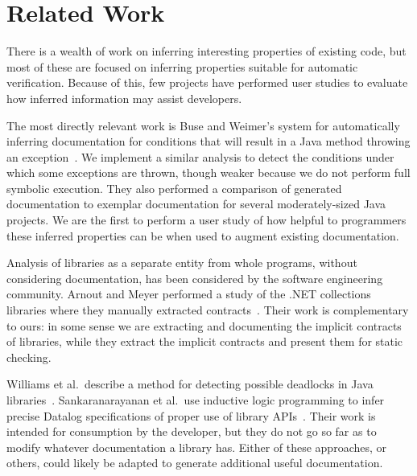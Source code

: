 \section{Related Work}
There is a wealth of work on inferring interesting properties of existing code,
but most of these are focused on inferring properties suitable for automatic
verification.
Because of this, few projects have performed user studies to evaluate how
inferred information may assist developers.

The most directly relevant work is Buse and Weimer's system for automatically
inferring documentation for conditions that will result in a Java method
throwing an exception~\cite{autodoc}.  We implement a similar analysis
to detect the conditions under which some exceptions are thrown, though weaker
because we do not perform full symbolic execution.  They also performed a
comparison of generated documentation to exemplar documentation for several
moderately-sized Java projects.  We are the first to perform a user study of how
helpful to programmers these inferred properties can be when used to augment existing
documentation.

Analysis of libraries as a separate entity from whole programs, without
considering documentation, has been considered by the software
engineering community.  Arnout and Meyer performed a study of the .NET
collections libraries where they manually extracted
contracts~\cite{findingcontracts}.  Their work is complementary to ours: in some
sense we are extracting and documenting the implicit contracts of libraries,
while they extract the implicit contracts and present them for static checking.

Williams et al.~describe a method for detecting possible deadlocks in Java
libraries~\cite{deadlocklibs}.  Sankaranarayanan et al.~use inductive logic
programming to infer precise Datalog specifications of proper use of library
APIs~\cite{mininglibspecs}.  Their work is intended for consumption by the
developer, but they do not go so far as to modify whatever documentation a
library has.  Either of these approaches, or others, could likely be adapted to
generate additional useful documentation.

